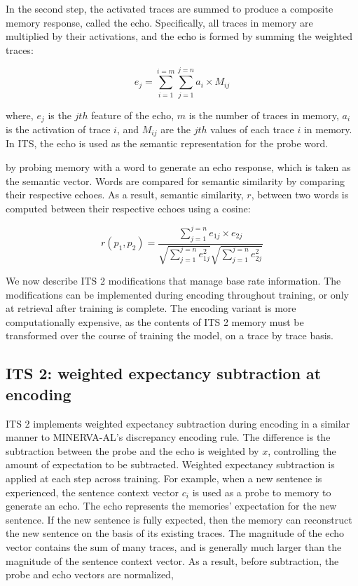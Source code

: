 \documentclass[10pt,letterpaper]{article}
\begin{document}
In the second step, the activated traces are summed to produce a composite memory response, called the echo. Specifically, all traces in memory are multiplied by their activations, and the echo is formed by summing the weighted traces:

\begin{equation}
e_j = \sum_{i=1}^{i=m}\sum_{j=1}^{j=n}a_i \times M_{ij}
\label{eq:echo}
\end{equation}

where, \(e_j\) is the \(jth\) feature of the echo, \(m\) is the number of traces in memory, \(a_i\) is the activation of trace \(i\), and \(M_{ij}\) are the \(jth\) values of each trace \(i\) in memory. In ITS, the echo is used as the semantic representation for the probe word.


 by probing memory with a word to generate an echo response, which is taken as the semantic vector. Words are compared for semantic similarity by comparing their respective echoes.
As a result, semantic similarity, \(r\), between two words is computed between their respective echoes using a cosine:

\begin{equation}
r(p_1,p_2) = \frac{\sum_{j=1}^{j=n}e_{1j} \times{} e_{2j}}{\sqrt{\sum_{j=1}^{j=n}e_{1j}^2}\sqrt{\sum_{j=1}^{j=n}e_{2j}^2}}
\label{eq:semanticsim}
\end{equation}

We now describe ITS 2 modifications that manage base rate information. The modifications can be implemented during encoding throughout training, or only at retrieval after training is complete. The encoding variant is more computationally expensive, as the contents of ITS 2 memory must be transformed over the course of training the model, on a trace by trace basis.

\subsection{ITS 2: weighted expectancy subtraction at encoding}

ITS 2 implements weighted expectancy subtraction during encoding in a similar manner to MINERVA-AL's discrepancy encoding rule. The difference is the subtraction between the probe and the echo is weighted by \(x\), controlling the amount of expectation to be subtracted. Weighted expectancy subtraction is applied at each step across training. For example, when a new sentence is experienced, the sentence context vector \(c_i\) is used as a probe to memory to generate an echo. The echo represents the memories' expectation for the new sentence. If the new sentence is fully expected, then the memory can reconstruct the new sentence on the basis of its existing traces. The magnitude of the echo vector contains the sum of many traces, and is generally much larger than the magnitude of the sentence context vector. As a result, before subtraction, the probe and echo vectors are normalized,
\end{document}
